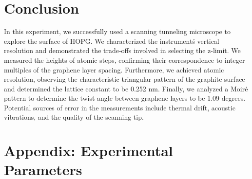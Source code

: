 \documentclass[12pt,a4paper]{article}
\begin{document}
\section{Conclusion}

In this experiment, we successfully used a scanning tunneling microscope to explore the surface of HOPG. We characterized the instrument\'s vertical resolution and demonstrated the trade-offs involved in selecting the z-limit. We measured the heights of atomic steps, confirming their correspondence to integer multiples of the graphene layer spacing. Furthermore, we achieved atomic resolution, observing the characteristic triangular pattern of the graphite surface and determined the lattice constant to be 0.252 nm.
Finally, we analyzed a Moiré pattern to determine the twist angle between graphene layers to be 1.09 degrees. Potential sources of error in the measurements include thermal drift, acoustic vibrations, and the quality of the scanning tip.

\printbibliography

\section*{Appendix: Experimental Parameters}
\end{document}
